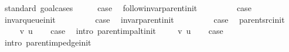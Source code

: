 \begin{isabellebody}
%
\isadelimproof
%
\endisadelimproof
%
\isatagproof
{}\isamarkupfalse%
\ {\isacharparenleft}{\kern0pt}standard{\isacharcomma}{\kern0pt}\ goal{\isacharunderscore}{\kern0pt}cases{\isacharparenright}{\kern0pt}\isanewline
{}\isamarkupfalse%
\ {}\isanewline
\ \ \isamarkupfalse%
\ {\isacharquery}{\kern0pt}case\ \isamarkupfalse%
\ follow{\isacharunderscore}{\kern0pt}invar{\isacharunderscore}{\kern0pt}parent{\isacharunderscore}{\kern0pt}init\ \isacommand{{\isachardot}{\kern0pt}}\isamarkupfalse%
\isanewline
{}\isamarkupfalse%
\isanewline
\ \ \isamarkupfalse%
\ {}\isanewline
\ \ \isamarkupfalse%
\ {\isacharquery}{\kern0pt}case\ \isamarkupfalse%
\ invar{\isacharunderscore}{\kern0pt}queue{\isacharunderscore}{\kern0pt}init\ \isacommand{{\isachardot}{\kern0pt}}\isamarkupfalse%
\isanewline
{}\isamarkupfalse%
\isanewline
\ \ \isamarkupfalse%
\ {}\isanewline
\ \ \isamarkupfalse%
\ {\isacharquery}{\kern0pt}case\ \isamarkupfalse%
\ invar{\isacharunderscore}{\kern0pt}parent{\isacharunderscore}{\kern0pt}init\ \isacommand{{\isachardot}{\kern0pt}}\isamarkupfalse%
\isanewline
{}\isamarkupfalse%
\isanewline
\ \ \isamarkupfalse%
\ {}\isanewline
\ \ \isamarkupfalse%
\ {\isacharquery}{\kern0pt}case\ \isamarkupfalse%
\ parent{\isacharunderscore}{\kern0pt}src{\isacharunderscore}{\kern0pt}init\ \isacommand{{\isachardot}{\kern0pt}}\isamarkupfalse%
\isanewline
{}\isamarkupfalse%
\isanewline
\ \ \isamarkupfalse%
\ {\isacharparenleft}{\kern0pt}{}\ v\ u{\isacharparenright}{\kern0pt}\isanewline
\ \ \isamarkupfalse%
\ {\isacharquery}{\kern0pt}case\ \isamarkupfalse%
\ {\isacharparenleft}{\kern0pt}intro\ parent{\isacharunderscore}{\kern0pt}imp{\isacharunderscore}{\kern0pt}alt{\isacharunderscore}{\kern0pt}init{\isacharparenright}{\kern0pt}\isanewline
{}\isamarkupfalse%
\isanewline
\ \ \isamarkupfalse%
\ {\isacharparenleft}{\kern0pt}{}\ v\ u{\isacharparenright}{\kern0pt}\isanewline
\ \ \isamarkupfalse%
\ {\isacharquery}{\kern0pt}case\ \isamarkupfalse%
\ {\isacharparenleft}{\kern0pt}intro\ parent{\isacharunderscore}{\kern0pt}imp{\isacharunderscore}{\kern0pt}edge{\isacharunderscore}{\kern0pt}init{\isacharparenright}{\kern0pt}\isanewline
{}\isamarkupfalse%

\end{isabellebody}
